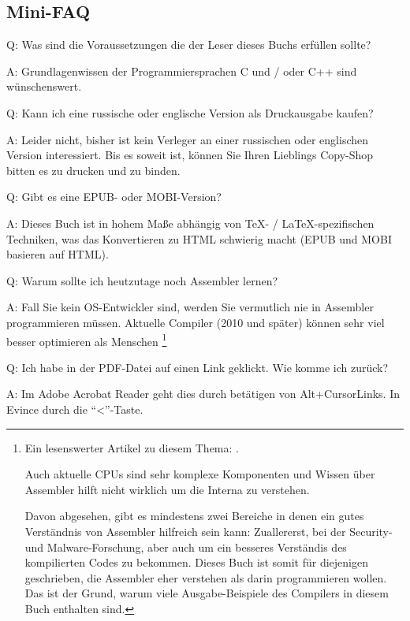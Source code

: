 \subsection*{Mini-FAQ}

\par Q: Was sind die Voraussetzungen die der Leser dieses Buchs erfüllen sollte?
\par A: Grundlagenwissen der Programmiersprachen C und / oder C++ sind wünschenswert.

\par Q: Kann ich eine russische oder englische Version als Druckausgabe kaufen?
\par A: Leider nicht, bisher ist kein Verleger an einer russischen oder englischen Version interessiert.
Bis es soweit ist, können Sie Ihren Lieblings Copy-Shop bitten es zu drucken und zu binden.

\par Q: Gibt es eine EPUB- oder MOBI-Version?
\par A: Dieses Buch ist in hohem Maße abhängig von \TeX{}- / \LaTeX{}-spezifischen Techniken,
was das Konvertieren zu HTML schwierig macht (EPUB und MOBI basieren auf HTML).

\par Q: Warum sollte ich heutzutage noch Assembler lernen?
\par A: Fall Sie kein \ac{OS}-Entwickler sind, werden Sie vermutlich nie in Assembler programmieren müssen.\textemdash{}
Aktuelle Compiler (2010 und später) können sehr viel besser optimieren als Menschen \footnote{Ein lesenswerter Artikel zu diesem Thema: \InSqBrackets{\AgnerFog}.

Auch aktuelle \ac{CPU}s sind sehr komplexe Komponenten und Wissen über Assembler hilft nicht wirklich
um die Interna zu verstehen.

Davon abgesehen, gibt es mindestens zwei Bereiche in denen ein gutes Verständnis von Assembler hilfreich
sein kann: Zuallererst, bei der Security- und Malware-Forschung, aber auch um ein besseres Verständis des kompilierten
Codes zu bekommen.
Dieses Buch ist somit für diejenigen geschrieben, die Assembler eher verstehen als darin programmieren wollen.
Das ist der Grund, warum viele Ausgabe-Beispiele des Compilers in diesem Buch enthalten sind.}

\par Q: Ich habe in der PDF-Datei auf einen Link geklickt. Wie komme ich zurück?
\par A: Im Adobe Acrobat Reader geht dies durch betätigen von Alt+CursorLinks.
In Evince durch die ``<''-Taste.

